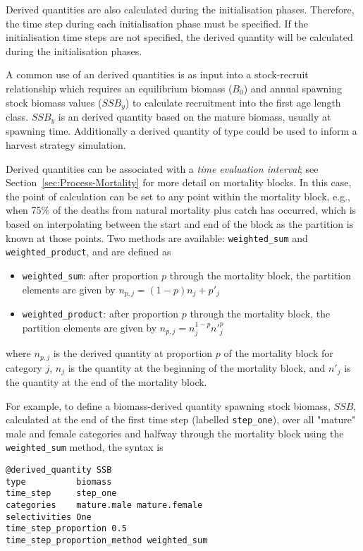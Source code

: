 Derived quantities are also calculated during the initialisation phases. Therefore, the time step during each initialisation phase must be specified. If the initialisation time steps are not specified, the derived quantity will be calculated during the initialisation phases. 

A common use of an derived quantities is as input into a stock-recruit relationship  which requires an equilibrium biomass ($B_0$) and annual spawning stock biomass values ($SSB_y$) to calculate recruitment into the first \ifAgeBased age \else length \fi class. $SSB_y$ is an derived quantity based on the mature biomass, usually at spawning time. Additionally a derived quantity of type  could be used to inform a harvest strategy simulation.

Derived quantities can be associated with a \textit{time evaluation interval}; see Section~\ref{sec:Process-Mortality} for more detail on mortality blocks. In this case, the point of calculation can be set to any point within the mortality block, e.g., when 75\% of the deaths from natural mortality plus catch has occurred, which is based on interpolating between the start and end of the block as the partition is known at those points. Two methods are available: \texttt{weighted\_sum} and \texttt{weighted\_product}, and are defined as

\begin{itemize}
	\item \texttt{weighted\_sum}: after proportion $p$ through the mortality block, the partition elements are given by $n_{p,j} = (1 - p)n_j + p'_j$

	\item \texttt{weighted\_product}: after proportion $p$ through the mortality block, the partition elements are given by $n_{p,j} = n_j^{1-p} n'^p_j$
\end{itemize}

where $n_{p,j}$ is the derived quantity at proportion $p$ of the mortality block for category $j$, $n_j$ is the quantity at the beginning of the mortality block, and $n'_j$ is the quantity at the end of the mortality block.

For example, to define a biomass-derived quantity spawning stock biomass, $SSB$, calculated at the end of the first time step (labelled \texttt{step\_one}), over all "mature" male and female categories and halfway through the mortality block using the \texttt{weighted\_sum} method, the syntax is

{\small{\begin{verbatim}
@derived_quantity SSB
type          biomass
time_step     step_one
categories    mature.male mature.female
selectivities One
time_step_proportion 0.5
time_step_proportion_method weighted_sum
\end{verbatim}}}


